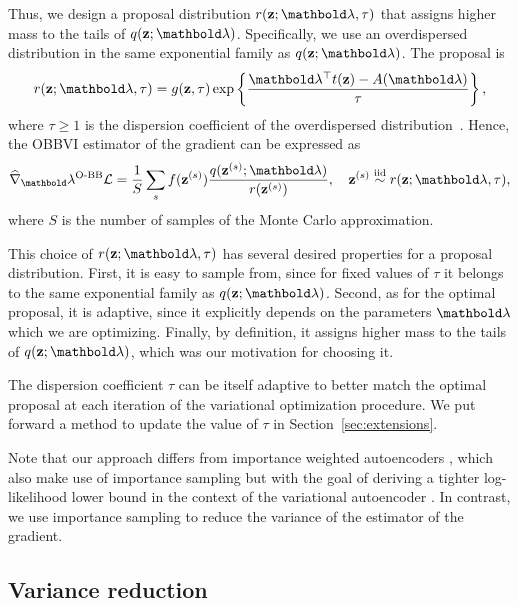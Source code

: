 \documentclass[]{article}
\begin{document}
Thus, we design a proposal distribution $r(\bz; \blambda, \tau)$ that
assigns higher mass to the tails of $q(\bz;\blambda)$.  Specifically,
we use an overdispersed distribution in the same exponential family as
$q(\bz;\blambda)$. The proposal is
\begin{align}
  r(\bz;\blambda,\tau) = g(\bz,\tau)\exp\left\{ \frac{\blambda^\top t(\bz) - A(\blambda)}{\tau}\right\},
\end{align}
where $\tau\geq 1$ is the dispersion coefficient of the overdispersed
distribution~\citep{Jorgensen1987}. Hence, the \gls{OBBVI} estimator
of the gradient can be expressed as
\begin{equation}\label{eq:est_grad_obb}
    \widehat{\nabla}_\blambda^{\textrm{O-BB}} \Lcal = \frac{1}{S}\sum_s f(\bz^{(s)})\frac{q(\bz^{(s)};\blambda)}{r(\bz^{(s)})}, \quad \bz^{(s)} \stackrel{\textrm{iid}}{\sim} r(\bz;\blambda,\tau),
\end{equation}
where $S$ is the number of samples of the Monte Carlo approximation.

This choice of $r(\bz;\blambda,\tau)$ has several desired properties
for a proposal distribution.  First, it is easy to sample from, since
for fixed values of $\tau$ it belongs to the same exponential family as
$q(\bz;\blambda)$.  Second, as for the optimal proposal, it is
adaptive, since it explicitly depends on the parameters $\blambda$ which we
are optimizing. Finally, by definition, it assigns higher mass to the
tails of $q(\bz;\blambda)$, which was our motivation for choosing it.

The dispersion coefficient $\tau$ can be itself adaptive to better
match the optimal proposal at each iteration of the variational
optimization procedure. We put forward a method to update the value of
$\tau$ in Section~\ref{sec:extensions}.

Note that our approach differs from importance weighted autoencoders
\citep{Burda2016}, which also make use of importance sampling but with
the goal of deriving a tighter log-likelihood lower bound in the
context of the variational autoencoder \citep{Kingma2014}. In
contrast, we use importance sampling to reduce the variance of the
estimator of the gradient.

\vspace*{-5pt}
\subsection{Variance reduction}
\vspace*{-5pt}
\end{document}
